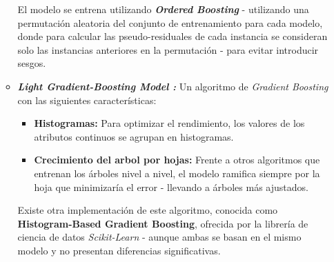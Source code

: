 \begin{itemize}
\begin{itemize}
		El modelo se entrena utilizando \textbf{\textit{Ordered Boosting}} - utilizando una permutación aleatoria del conjunto de entrenamiento para cada modelo, donde para calcular las pseudo-residuales de cada instancia se consideran solo las instancias anteriores en la permutación \cite{catboost2} - para evitar introducir sesgos.
		\item \textbf{\textit{Light Gradient-Boosting Model \cite{NIPS2017_6449f44a}:}} Un algoritmo de \textit{Gradient Boosting} con las siguientes características:
		\begin{itemize}
			\item \textbf{Histogramas:} Para optimizar el rendimiento, los valores de los atributos continuos se agrupan en histogramas.
			\item \textbf{Crecimiento del arbol por hojas:} Frente a otros algoritmos que entrenan los árboles nivel a nivel, el modelo ramifica siempre por la hoja que minimizaría el error - llevando a árboles más ajustados.
		\end{itemize}
		
		Existe otra implementación de este algoritmo, conocida como \textbf{Histogram-Based Gradient Boosting}, ofrecida por la librería de ciencia de datos \textit{Scikit-Learn} \cite{scikit-learn} - aunque ambas se basan en el mismo modelo y no presentan diferencias significativas.
	\end{itemize}
\end{itemize}

